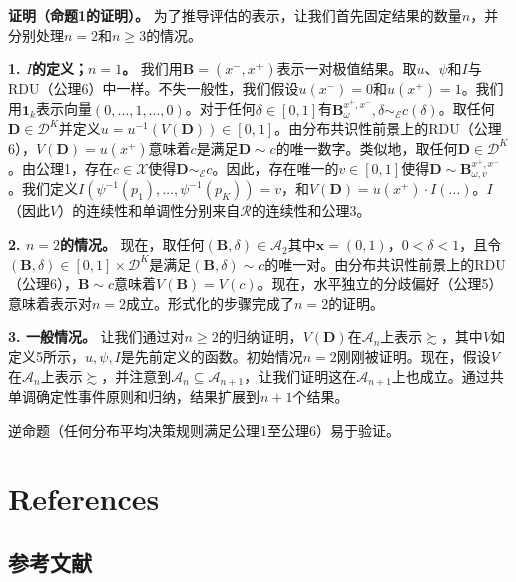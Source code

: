 \documentclass[12pt,a4paper]{article}
\newenvironment{translation}
  {\par\noindent{\color{transblue}\ignorespaces}}
  {\par\medskip}
\begin{document}
\begin{translation}
\textbf{证明（命题1的证明）。} 为了推导评估的表示，让我们首先固定结果的数量$n$，并分别处理$n=2$和$n \geq 3$的情况。

\textbf{1. $I$的定义；$n=1$。} 我们用$\mathbf{B} = (x^{-}, x^{+})$表示一对极值结果。取$u$、$\psi$和$I$与RDU（公理6）中一样。不失一般性，我们假设$u(x^{-}) = 0$和$u(x^{+}) = 1$。我们用$\mathbf{1}_{k}$表示向量$(0, \dots, 1, \dots, 0)$。对于任何$\delta \in [0,1]$有$\mathbf{B}^{x^{+},x^{-}}_{\omega}, \delta \sim_{\mathcal{E}} c(\delta)$。取任何$\mathbf{D} \in \mathcal{D}^{K}$并定义$u = u^{-1}(V(\mathbf{D})) \in [0,1]$。由分布共识性前景上的RDU（公理6），$V(\mathbf{D}) = u(x^{+})$意味着$c$是满足$\mathbf{D} \sim c$的唯一数字。类似地，取任何$\mathbf{D} \in \mathcal{D}^{K}$。由公理1，存在$c \in \mathcal{X}$使得$\mathbf{D} \sim_{\mathcal{E}} c$。因此，存在唯一的$v \in [0,1]$使得$\mathbf{D} \sim \mathbf{B}^{x^{+},x^{-}}_{\omega, v}$。我们定义$I(\psi^{-1}(p_{1}), \dots, \psi^{-1}(p_{K})) = v$，和$V(\mathbf{D}) = u(x^{+}) \cdot I(\dots)$。$I$（因此$V$）的连续性和单调性分别来自$\mathcal{R}$的连续性和公理3。

\textbf{2. $n=2$的情况。} 现在，取任何$(\mathbf{B}, \delta) \in \mathcal{A}_{2}$其中$\mathbf{x} = (0, 1)$，$0 < \delta < 1$，且令$(\mathbf{B}, \delta) \in [0,1] \times \mathcal{D}^{K}$是满足$(\mathbf{B}, \delta) \sim c$的唯一对。由分布共识性前景上的RDU（公理6），$\mathbf{B} \sim c$意味着$V(\mathbf{B}) = V(c)$。现在，水平独立的分歧偏好（公理5）意味着表示对$n=2$成立。形式化的步骤完成了$n=2$的证明。

\textbf{3. 一般情况。} 让我们通过对$n \geq 2$的归纳证明，$V(\mathbf{D})$在$\mathcal{A}_{n}$上表示$\succsim$，其中$V$如定义5所示，$u, \psi, I$是先前定义的函数。初始情况$n=2$刚刚被证明。现在，假设$V$在$\mathcal{A}_{n}$上表示$\succsim$，并注意到$\mathcal{A}_{n} \subseteq \mathcal{A}_{n+1}$，让我们证明这在$\mathcal{A}_{n+1}$上也成立。通过共单调确定性事件原则和归纳，结果扩展到$n+1$个结果。

逆命题（任何分布平均决策规则满足公理1至公理6）易于验证。
\end{translation}

\newpage
\section*{References}
{\color{transblue}\subsection*{参考文献}}
\end{document}
